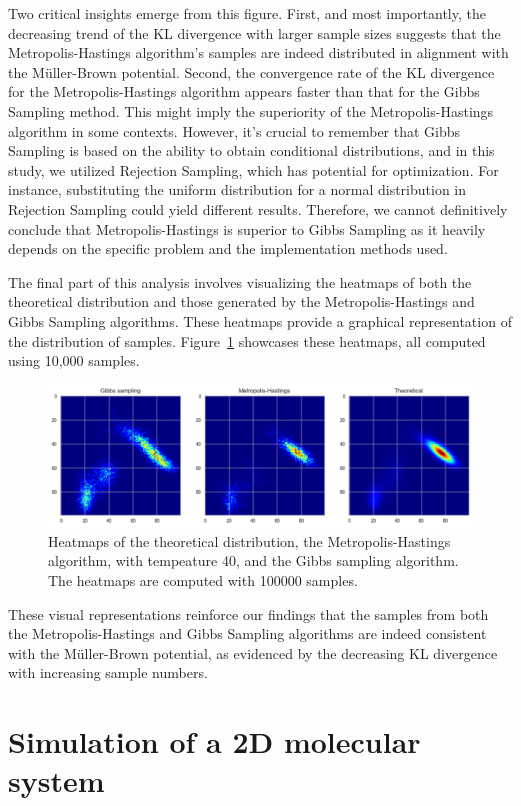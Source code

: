 \documentclass{report}
\begin{document}
Two critical insights emerge from this figure. First, and most importantly, the decreasing trend of the KL divergence with larger sample sizes suggests that the Metropolis-Hastings algorithm's samples are indeed distributed in alignment with the Müller-Brown potential. Second, the convergence rate of the KL divergence for the Metropolis-Hastings algorithm appears faster than that for the Gibbs Sampling method. This might imply the superiority of the Metropolis-Hastings algorithm in some contexts. However, it's crucial to remember that Gibbs Sampling is based on the ability to obtain conditional distributions, and in this study, we utilized Rejection Sampling, which has potential for optimization. For instance, substituting the uniform distribution for a normal distribution in Rejection Sampling could yield different results. Therefore, we cannot definitively conclude that Metropolis-Hastings is superior to Gibbs Sampling as it heavily depends on the specific problem and the implementation methods used.

The final part of this analysis involves visualizing the heatmaps of both the theoretical distribution and those generated by the Metropolis-Hastings and Gibbs Sampling algorithms. These heatmaps provide a graphical representation of the distribution of samples. Figure~\ref{fig:heatmaps} showcases these heatmaps, all computed using 10,000 samples.

\begin{figure}[H]
	\centering
	\includegraphics[width=0.75\linewidth]{./Figures/MCMC/heatmaps.png}
	\caption{Heatmaps of the theoretical distribution, the Metropolis-Hastings algorithm, with tempeature 40, and the Gibbs sampling algorithm. The heatmaps are computed with 100000 samples.}
	\label{fig:heatmaps}
\end{figure}

These visual representations reinforce our findings that the samples from both the Metropolis-Hastings and Gibbs Sampling algorithms are indeed consistent with the Müller-Brown potential, as evidenced by the decreasing KL divergence with increasing sample numbers.

\section{Simulation of a 2D molecular system}
\label{sec:simulation_2d_molecular_system}
\end{document}
